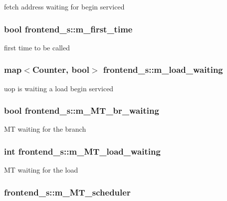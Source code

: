 \label{structfrontend__s_a10ac2fa31ffde8759fc710b754041e3e}
fetch address waiting for begin serviced \hypertarget{structfrontend__s_aa6d2610315e51c45c127bed07a4d188d}{
\subsubsection[{m\_\-first\_\-time}]{\setlength{\rightskip}{0pt plus 5cm}bool {\bf frontend\_\-s::m\_\-first\_\-time}}}
\label{structfrontend__s_aa6d2610315e51c45c127bed07a4d188d}
first time to be called \hypertarget{structfrontend__s_a01c6f3f474a3bc339d5b89bbb8a06096}{
\subsubsection[{m\_\-load\_\-waiting}]{\setlength{\rightskip}{0pt plus 5cm}map$<$Counter, bool$>$ {\bf frontend\_\-s::m\_\-load\_\-waiting}}}
\label{structfrontend__s_a01c6f3f474a3bc339d5b89bbb8a06096}
uop is waiting a load begin serviced \hypertarget{structfrontend__s_a6565486357402733c4b2c1486054551f}{
\subsubsection[{m\_\-MT\_\-br\_\-waiting}]{\setlength{\rightskip}{0pt plus 5cm}bool {\bf frontend\_\-s::m\_\-MT\_\-br\_\-waiting}}}
\label{structfrontend__s_a6565486357402733c4b2c1486054551f}
MT waiting for the branch \hypertarget{structfrontend__s_ae06574214d7918161e7483fce9853330}{
\subsubsection[{m\_\-MT\_\-load\_\-waiting}]{\setlength{\rightskip}{0pt plus 5cm}int {\bf frontend\_\-s::m\_\-MT\_\-load\_\-waiting}}}
\label{structfrontend__s_ae06574214d7918161e7483fce9853330}
MT waiting for the load \hypertarget{structfrontend__s_a448e3c3264b1dead315e8e1690405ecf}{
\subsubsection[{m\_\-MT\_\-scheduler}]{ {\bf frontend\_\-s::m\_\-MT\_\-scheduler}}}
